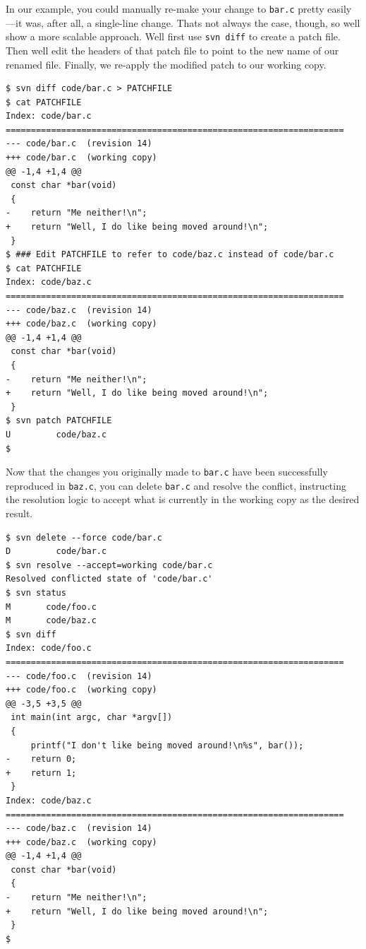 In our example, you could manually re-make your change to \texttt{bar.c}
pretty easily---it was, after all, a single-line change.
That\textquotesingle s not always the case, though, so
we\textquotesingle ll show a more scalable approach.
We\textquotesingle ll first use \texttt{svn\ diff} to create a patch
file. Then we\textquotesingle ll edit the headers of that patch file to
point to the new name of our renamed file. Finally, we re-apply the
modified patch to our working copy.

\begin{verbatim}
$ svn diff code/bar.c > PATCHFILE
$ cat PATCHFILE
Index: code/bar.c
===================================================================
--- code/bar.c  (revision 14)
+++ code/bar.c  (working copy)
@@ -1,4 +1,4 @@
 const char *bar(void)
 {
-    return "Me neither!\n";
+    return "Well, I do like being moved around!\n";
 }
$ ### Edit PATCHFILE to refer to code/baz.c instead of code/bar.c
$ cat PATCHFILE
Index: code/baz.c
===================================================================
--- code/baz.c  (revision 14)
+++ code/baz.c  (working copy)
@@ -1,4 +1,4 @@
 const char *bar(void)
 {
-    return "Me neither!\n";
+    return "Well, I do like being moved around!\n";
 }
$ svn patch PATCHFILE
U         code/baz.c
$
\end{verbatim}

Now that the changes you originally made to \texttt{bar.c} have been
successfully reproduced in \texttt{baz.c}, you can delete \texttt{bar.c}
and resolve the conflict, instructing the resolution logic to accept
what is currently in the working copy as the desired result.

\begin{verbatim}
$ svn delete --force code/bar.c
D         code/bar.c
$ svn resolve --accept=working code/bar.c
Resolved conflicted state of 'code/bar.c'
$ svn status
M       code/foo.c
M       code/baz.c
$ svn diff
Index: code/foo.c
===================================================================
--- code/foo.c  (revision 14)
+++ code/foo.c  (working copy)
@@ -3,5 +3,5 @@
 int main(int argc, char *argv[])
 {
     printf("I don't like being moved around!\n%s", bar());
-    return 0;
+    return 1;
 }
Index: code/baz.c
===================================================================
--- code/baz.c  (revision 14)
+++ code/baz.c  (working copy)
@@ -1,4 +1,4 @@
 const char *bar(void)
 {
-    return "Me neither!\n";
+    return "Well, I do like being moved around!\n";
 }
$
\end{verbatim}

